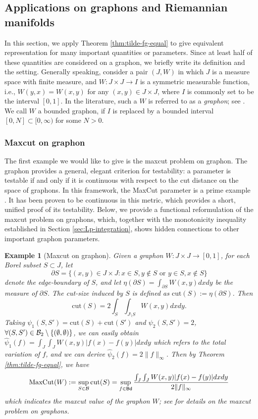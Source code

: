 \documentclass[12pt,a4paper]{article}
\newtheorem{example}[theorem]{Example}
\begin{document}
\subsection{Applications on graphons and Riemannian manifolds}\label{subsec:first-example}

In this section, we apply Theorem \ref{thm:tilde-fg-equal} to give equivalent representation for many important quantities or parameters. 
Since at least half of these quantities are considered on a graphon, we briefly write its definition and the setting. Generally speaking, consider a pair $(J,W)$ in which $J$ is a measure space with finite measure, and $W:J\times J\to I$ is a symmetric measurable function, i.e., $W(y,x)=W(x,y)$ for any $(x,y)\in J\times J$, where $I$ is commonly set to be the interval $[0,1]$. In the literature, such a $W$ is referred to as a \emph{graphon}; see \cite{Lovasz-book}. 
We call $W$ a bounded graphon, if $I$ is replaced by a bounded interval $[0,N]\subset [0,\infty)$ for some $N>0$. 

\subsubsection{Maxcut on graphon}
The first example we would like to give is the maxcut problem on graphon. 
The graphon provides a general, elegant criterion for testability: a parameter is testable if and only if it is continuous with respect to the cut distance on the space of graphons. In this framework, the MaxCut parameter is a prime example \cite{Borgs06}. It has been proven to be continuous in this metric, which provides a short, unified proof of its testability. 
Below, we provide a functional reformulation of the maxcut problem on graphons, which, together with the monotonicity inequality established in Section \ref{sec:Lp-integration}, shows hidden connections to other important graphon parameters. 
\begin{example}[Maxcut on graphon]\label{exam:maxcut}
Given a graphon $W:J\times J\to [0,1]$, for each Borel subset $S\subset J$, let $$\partial S=\{(x,y)\in J\times J:x\in S,y\not\in S\text{ or }y\in S,x\not\in S\}$$
denote the edge-boundary of $S$, and let $\eta(\partial S)=\int_{\partial S}W(x,y)dxdy$ be the measure of $\partial S$. The cut-size induced by $S$ is defined as $\mathrm{cut}(S):= \eta(\partial S)$. Then 
$$\mathrm{cut}(S)=2\int_{S}\int_{J\setminus S}W(x,y)dxdy.$$ Taking $\psi_1(S,S')=\mathrm{cut}(S)+\mathrm{cut}(S')$ and $\psi_2(S,S')=2$, $\forall (S,S')\in\mathcal{B}_2\setminus\{(\emptyset,\emptyset)\}$, we can easily obtain  $\widehat{\psi}_1(f)=\int_{J}\int_{J} W(x,y)|f(x)-f(y)|dxdy$ which refers to the total variation of $f$, and we can derive $\widehat{\psi}_2(f)=2\|f\|_\infty$. Then by Theorem \ref{thm:tilde-fg-equal}, we have
$$ \text{MaxCut}(W):=\sup_{S\in\mathcal{B}}\mathrm{cut}(S)=\sup_{f\in {\sf Bd} }\frac{\int_{J}\int_{J} W(x,y)|f(x)-f(y)|dxdy}{2\|f\|_\infty}$$
which indicates the \emph{maxcut} value of the graphon $W$; see \cite{Zhang/graphon} for details on the maxcut problem on graphons.
\end{example}
\end{document}
